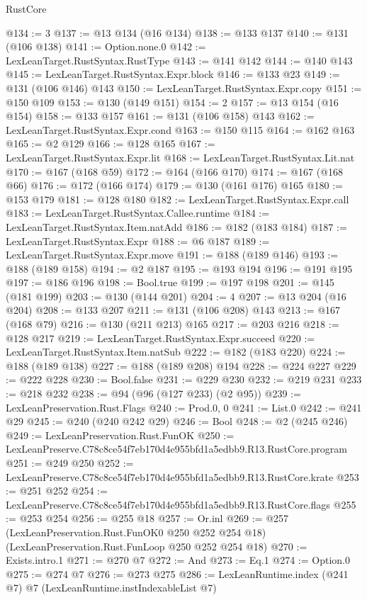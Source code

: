 \begin{lexlean}{RustCore}
\begin{coremodule}
@134 := 3
@137 := @13 @134 (@16 @134)
@138 := @133 @137
@140 := @131 (@106 @138)
@141 := Option.none.{0}
@142 := LexLeanTarget.RustSyntax.RustType
@143 := @141 @142
@144 := @140 @143
@145 := LexLeanTarget.RustSyntax.Expr.block
@146 := @133 @23
@149 := @131 (@106 @146) @143
@150 := LexLeanTarget.RustSyntax.Expr.copy
@151 := @150 @109
@153 := @130 (@149 @151)
@154 := 2
@157 := @13 @154 (@16 @154)
@158 := @133 @157
@161 := @131 (@106 @158) @143
@162 := LexLeanTarget.RustSyntax.Expr.cond
@163 := @150 @115
@164 := @162 @163
@165 := @2 @129
@166 := @128 @165
@167 := LexLeanTarget.RustSyntax.Expr.lit
@168 := LexLeanTarget.RustSyntax.Lit.nat
@170 := @167 (@168 @59)
@172 := @164 (@166 @170)
@174 := @167 (@168 @66)
@176 := @172 (@166 @174)
@179 := @130 (@161 @176) @165
@180 := @153 @179
@181 := @128 @180
@182 := LexLeanTarget.RustSyntax.Expr.call
@183 := LexLeanTarget.RustSyntax.Callee.runtime
@184 := LexLeanTarget.RustSyntax.Item.natAdd
@186 := @182 (@183 @184)
@187 := LexLeanTarget.RustSyntax.Expr
@188 := @6 @187
@189 := LexLeanTarget.RustSyntax.Expr.move
@191 := @188 (@189 @146)
@193 := @188 (@189 @158)
@194 := @2 @187
@195 := @193 @194
@196 := @191 @195
@197 := @186 @196
@198 := Bool.true
@199 := @197 @198
@201 := @145 (@181 @199)
@203 := @130 (@144 @201)
@204 := 4
@207 := @13 @204 (@16 @204)
@208 := @133 @207
@211 := @131 (@106 @208) @143
@213 := @167 (@168 @79)
@216 := @130 (@211 @213) @165
@217 := @203 @216
@218 := @128 @217
@219 := LexLeanTarget.RustSyntax.Expr.succeed
@220 := LexLeanTarget.RustSyntax.Item.natSub
@222 := @182 (@183 @220)
@224 := @188 (@189 @138)
@227 := @188 (@189 @208) @194
@228 := @224 @227
@229 := @222 @228
@230 := Bool.false
@231 := @229 @230
@232 := @219 @231
@233 := @218 @232
@238 := @94 (@96 (@127 @233) (@2 @95))
@239 := LexLeanPreservation.Rust.Flags
@240 := Prod.{0, 0}
@241 := List.{0}
@242 := @241 @29
@245 := @240 (@240 @242 @29)
@246 := Bool
@248 := @2 (@245 @246)
@249 := LexLeanPreservation.Rust.FunOK
@250 := LexLeanPreserve.C78c8ce54f7eb170d4e955bfd1a5edbb9.R13.RustCore.program
@251 := @249 @250
@252 := LexLeanPreserve.C78c8ce54f7eb170d4e955bfd1a5edbb9.R13.RustCore.krate
@253 := @251 @252
@254 := LexLeanPreserve.C78c8ce54f7eb170d4e955bfd1a5edbb9.R13.RustCore.flags
@255 := @253 @254
@256 := @255 @18
@257 := Or.inl
@269 := @257
    (LexLeanPreservation.Rust.FunOK0 @250 @252 @254 @18)
    (LexLeanPreservation.Rust.FunLoop @250 @252 @254 @18)
@270 := Exists.intro.{1}
@271 := @270 @7
@272 := And
@273 := Eq.{1}
@274 := Option.{0}
@275 := @274 @7
@276 := @273 @275
@286 := LexLeanRuntime.index
    (@241 @7)
    @7
    (LexLeanRuntime.instIndexableList @7)

\end{coremodule}
\end{lexlean}
